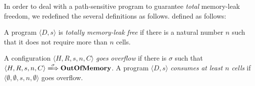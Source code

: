 In order to deal with a path-sensitive program to guarantee
\emph{total} memory-leak freedom, we redefined the several definitions
as follows.  defined as follows:
\begin{myDef}
\label{df:ml}
A program \(\langle D, s \rangle\) is \emph{totally memory-leak free}
if there is a natural number \(n\) such that it does not require more
than \(n\) cells.
\end{myDef}
\begin{myDef}
\label{df:ml}
A configuration \(\langle H, R, s, n, C \rangle\) \emph{goes overflow} if
there is \(\sigma\) such that \(\langle H, R, s, n, C \rangle
\xLongrightarrow{\sigma} \OVERFLOW\).  A program \(\langle D, s
\rangle\) \emph{consumes at least \(n\) cells} if \(\langle \emptyset,
\emptyset, s, n, \emptyset \rangle\) goes overflow.  
\end{myDef}



